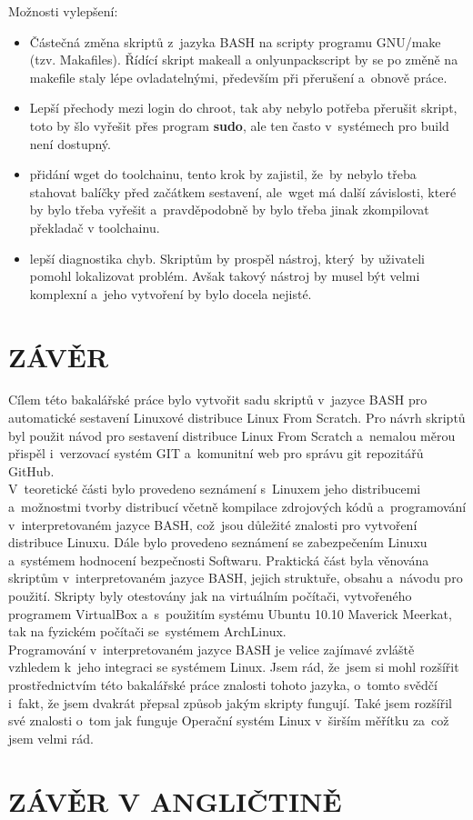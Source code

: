 \documentclass[a4paper,12pt]{article}
\newcommand{\nn}[1]{\clearpage\section*{\texorpdfstring{\uppercase{#1}}{#1}}\addcontentsline{toc}{section}{\uppercase{#1}}}%
\renewcommand{\b}[1]{\textbf{#1}} %
\begin{document}
Možnosti vylepšení:
\begin{itemize}
 \item Částečná změna skriptů z~jazyka BASH na scripty programu GNU/make (tzv. Makafiles). Řídící skript makeall a onlyunpackscript by se po změně na makefile staly lépe ovladatelnými, především při přerušení a~obnově práce.
 \item Lepší přechody mezi login do chroot, tak aby nebylo potřeba přerušit skript, toto by šlo vyřešit přes program \b{sudo}, ale ten často v~systémech pro build není dostupný.
 \item přidání wget do toolchainu, tento krok by zajistil, že~by nebylo třeba stahovat balíčky před začátkem sestavení, ale~wget má další závislosti, které by bylo třeba vyřešit a~pravděpodobně by bylo třeba jinak zkompilovat překladač v toolchainu.
 \item lepší diagnostika chyb. Skriptům by prospěl nástroj, který~by uživateli pomohl lokalizovat problém. Avšak takový nástroj by musel být velmi komplexní a~jeho vytvoření by bylo docela nejisté.
\end{itemize}


\nn{Závěr}
Cílem této bakalářské práce bylo vytvořit sadu skriptů v~jazyce BASH pro automatické sestavení Linuxové distribuce Linux From Scratch. Pro návrh skriptů byl použit návod pro sestavení distribuce Linux From Scratch a~nemalou měrou přispěl i~verzovací systém GIT a~komunitní web pro správu git repozitářů GitHub.\\

V~teoretické části bylo provedeno seznámení s~Linuxem jeho distribucemi a~možnostmi tvorby distribucí včetně kompilace zdrojových kódů a~programování v~interpretovaném jazyce BASH, což~jsou důležité znalosti pro vytvoření distribuce Linuxu. Dále bylo provedeno seznámení se zabezpečením Linuxu a~systémem hodnocení bezpečnosti Softwaru. Praktická část byla věnována skriptům v~interpretovaném jazyce BASH, jejich struktuře, obsahu a~návodu pro použití. Skripty byly otestovány jak na virtuálním počítači, vytvořeného programem VirtualBox a~s~použitím systému Ubuntu 10.10 Maverick Meerkat, tak na fyzickém počítači se~systémem ArchLinux.\\

Programování v~interpretovaném jazyce BASH je velice zajímavé zvláště vzhledem k~jeho integraci se systémem Linux. Jsem rád, že~jsem si mohl rozšířit prostřednictvím této bakalářské práce znalosti tohoto jazyka, o~tomto svědčí i~fakt, že jsem dvakrát přepsal způsob jakým skripty fungují. Také jsem rozšířil své znalosti o~tom jak funguje Operační systém Linux v~širším měřítku za~což jsem velmi rád.
\newpage
\nn{Závěr v Angličtině}
\end{document}
